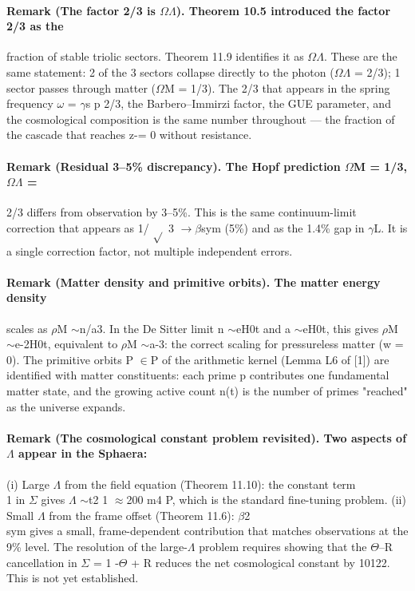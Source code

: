 \documentclass[12pt,a4paper]{article}
\begin{document}
\paragraph*{Remark (The factor 2/3 is $\Omega$$\Lambda$). Theorem 10.5 introduced the factor 2/3 as the}
fraction of stable triolic sectors. Theorem 11.9 identifies it as $\Omega$$\Lambda$. These are the same statement: 2 of the 3 sectors collapse directly to the photon ($\Omega$$\Lambda$ = 2/3); 1 sector passes through matter ($\Omega$M = 1/3). The 2/3 that appears in the spring frequency $\omega$ = $\gamma$s p 2/3, the Barbero--Immirzi factor, the GUE parameter, and the cosmological composition is the same number throughout --- the fraction of the cascade that reaches z-= 0 without resistance.
\paragraph*{Remark (Residual 3--5\% discrepancy). The Hopf prediction $\Omega$M = 1/3, $\Omega$$\Lambda$ =}
2/3 differs from observation by 3--5\%. This is the same continuum-limit correction that appears as 1/ $\sqrt{}$ 3 $\to$$\beta$sym (5\%) and as the 1.4\% gap in $\gamma$L. It is a single correction factor, not multiple independent errors.
\paragraph*{Remark (Matter density and primitive orbits). The matter energy density}
scales as $\rho$M $\sim$n/a3. In the De Sitter limit n $\sim$eH0t and a $\sim$eH0t, this gives $\rho$M $\sim$e-2H0t, equivalent to $\rho$M $\sim$a-3: the correct scaling for pressureless matter (w = 0). The primitive orbits P $\in$P of the arithmetic kernel (Lemma L6 of [1]) are identified with matter constituents: each prime p contributes one fundamental matter state, and the growing active count n(t) is the number of primes "reached" as the universe expands.
\paragraph*{Remark (The cosmological constant problem revisited). Two aspects of $\Lambda$ appear in the Sphaera:}
(i) Large $\Lambda$ from the field equation (Theorem 11.10): the constant term\\
1 in $\Sigma$ gives $\Lambda$ $\sim$t2 1 $\approx$200 m4 P, which is the standard fine-tuning problem.
(ii) Small $\Lambda$ from the frame offset (Theorem 11.6): $\beta$2\\
sym gives a small, frame-dependent contribution that matches observations at the 9\% level. The resolution of the large-$\Lambda$ problem requires showing that the $\Theta$--R cancellation in $\Sigma$ = 1 -$\Theta$ + R reduces the net cosmological constant by 10122. This is not yet established.
\end{document}
